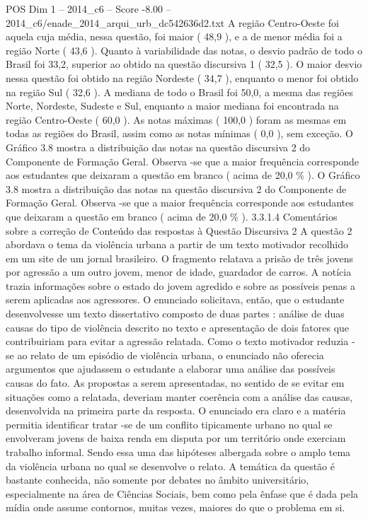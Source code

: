 \begin{textsample}{POS Dim 1 – 2014\_c6 – Score -8.00 – 2014\_c6/enade\_2014\_arqui\_urb\_dc542636d2.txt}
A região Centro-Oeste foi aquela cuja média, nessa questão, foi maior ( 48,9 ), e a de menor média foi a região Norte ( 43,6 ).
Quanto à variabilidade das notas, o desvio padrão de todo o Brasil foi 33,2, superior ao obtido na questão discursiva 1 ( 32,5 ).
O maior desvio nessa questão foi obtido na região Nordeste ( 34,7 ), enquanto o menor foi obtido na região Sul ( 32,6 ).
A mediana de todo o Brasil foi 50,0, a mesma das regiões Norte, Nordeste, Sudeste e Sul, enquanto a maior mediana foi encontrada na região Centro-Oeste ( 60,0 ).
As notas máximas ( 100,0 ) foram as mesmas em todas as regiões do Brasil, assim como as notas mínimas ( 0,0 ), sem exceção.
O Gráfico 3.8 mostra a distribuição das notas na questão discursiva 2 do Componente de Formação Geral.
Observa -se que a maior frequência corresponde aos estudantes que deixaram a questão em branco ( acima de 20,0 \% ).
O Gráfico 3.8 mostra a distribuição das notas na questão discursiva 2 do Componente de Formação Geral.
Observa -se que a maior frequência corresponde aos estudantes que deixaram a questão em branco ( acima de 20,0 \% ). 3.3.1.4 Comentários sobre a correção de Conteúdo das respostas à Questão Discursiva 2 A questão 2 abordava o tema da violência urbana a partir de um texto motivador recolhido em um site de um jornal brasileiro.
O fragmento relatava a prisão de três jovens por agressão a um outro jovem, menor de idade, guardador de carros.
A notícia trazia informações sobre o estado do jovem agredido e sobre as possíveis penas a serem aplicadas aos agressores.
O enunciado solicitava, então, que o estudante desenvolvesse um texto dissertativo composto de duas partes : análise de duas causas do tipo de violência descrito no texto e apresentação de dois fatores que contribuiriam para evitar a agressão relatada.
Como o texto motivador reduzia -se ao relato de um episódio de violência urbana, o enunciado não oferecia argumentos que ajudassem o estudante a elaborar uma análise das possíveis causas do fato.
As propostas a serem apresentadas, no sentido de se evitar em situações como a relatada, deveriam manter coerência com a análise das causas, desenvolvida na primeira parte da resposta.
O enunciado era claro e a matéria permitia identificar tratar -se de um conflito tipicamente urbano no qual se envolveram jovens de baixa renda em disputa por um território onde exerciam trabalho informal.
Sendo essa uma das hipóteses albergada sobre o amplo tema da violência urbana no qual se desenvolve o relato.
A temática da questão é bastante conhecida, não somente por debates no âmbito universitário, especialmente na área de Ciências Sociais, bem como pela ênfase que é dada pela mídia onde assume contornos, muitas vezes, maiores do que o problema em si.

\end{textsample}
